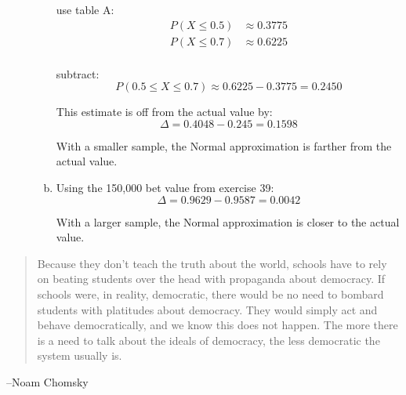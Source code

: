 \documentclass[letterpaper, landscape]{exam}
\begin{document}
\begin{description}
\begin{enumerate}[(a)]
            use table A:\@
            \begin{align*}
              P(X \leq 0.5) & \approx 0.3775 \\
              P(X \leq 0.7) & \approx 0.6225 \\
            \end{align*}

            subtract:
            \[
              P(0.5 \leq X \leq 0.7) \approx 0.6225 - 0.3775 = 0.2450
            \]

            This estimate is off from the actual value by:
            \[
              \Delta = 0.4048 - 0.245 = \boxed{ 0.1598 }
            \]

            With a smaller sample, the Normal approximation is farther from the
            actual value.
            
          \item Using the 150,000 bet value from exercise 39:
            \[
              \Delta = 0.9629 - 0.9587 = \boxed{ 0.0042 }
            \]

            With a larger sample, the Normal approximation is closer to the
            actual value.

        \end{enumerate}
  \end{description}

  \else
    \vspace{10 cm}
    \begin{quote}
      \begin{em}
        Because they don't teach the truth about the world, schools have to rely on
        beating students over the head with propaganda about democracy. If schools were,
        in reality, democratic, there would be no need to bombard students with
        platitudes about democracy. They would simply act and behave democratically, and
        we know this does not happen. The more there is a need to talk about the ideals
        of democracy, the less democratic the system usually is.
      \end{em}
    \end{quote}
    \hspace{1 cm} --Noam Chomsky
  \fi
\end{document}
